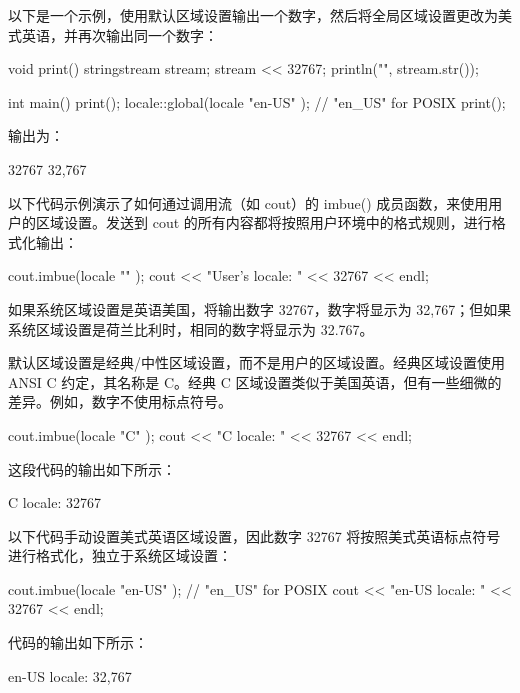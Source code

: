 以下是一个示例，使用默认区域设置输出一个数字，然后将全局区域设置更改为美式英语，并再次输出同一个数字：

\begin{cpp}
void print()
{
    stringstream stream;
    stream << 32767;
    println("{}", stream.str());
}

int main()
{
    print();
    locale::global(locale { "en-US" }); // "en_US" for POSIX
    print();
}
\end{cpp}

输出为：

\begin{shell}
32767
32,767
\end{shell}


以下代码示例演示了如何通过调用流（如 cout）的 imbue() 成员函数，来使用用户的区域设置。发送到 cout 的所有内容都将按照用户环境中的格式规则，进行格式化输出：

\begin{cpp}
cout.imbue(locale { "" });
cout << "User's locale: " << 32767 << endl;
\end{cpp}

如果系统区域设置是英语美国，将输出数字 32767，数字将显示为 32,767；但如果系统区域设置是荷兰比利时，相同的数字将显示为 32.767。

默认区域设置是经典/中性区域设置，而不是用户的区域设置。经典区域设置使用 ANSI C 约定，其名称是 C。经典 C 区域设置类似于美国英语，但有一些细微的差异。例如，数字不使用标点符号。

\begin{cpp}
cout.imbue(locale { "C" });
cout << "C locale: " << 32767 << endl;
\end{cpp}

这段代码的输出如下所示：

\begin{shell}
C locale: 32767
\end{shell}

以下代码手动设置美式英语区域设置，因此数字 32767 将按照美式英语标点符号进行格式化，独立于系统区域设置：

\begin{cpp}
cout.imbue(locale { "en-US" }); // "en_US" for POSIX
cout << "en-US locale: " << 32767 << endl;
\end{cpp}

代码的输出如下所示：

\begin{shell}
en-US locale: 32,767
\end{shell}

